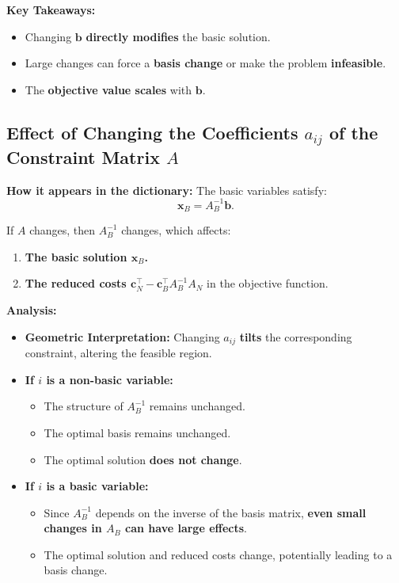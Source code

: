 \textbf{Key Takeaways:}
\begin{itemize}
    \item Changing \( \mathbf{b} \) \textbf{directly modifies} the basic solution.
    \item Large changes can force a \textbf{basis change} or make the problem \textbf{infeasible}.
    \item The \textbf{objective value scales} with \( \mathbf{b} \).
\end{itemize}

\subsection{Effect of Changing the Coefficients \( a_{ij} \) of the Constraint Matrix \( A \)}

\textbf{How it appears in the dictionary:}  
The basic variables satisfy:
\[
\mathbf{x}_B = A_B^{-1} \mathbf{b}.
\]

If \( A \) changes, then \( A_B^{-1} \) changes, which affects:
\begin{enumerate}
    \item \textbf{The basic solution \( \mathbf{x}_B \).}
    \item \textbf{The reduced costs \( \mathbf{c}_N^\top - \mathbf{c}_B^\top A_B^{-1} A_N \)} in the objective function.
\end{enumerate}

\textbf{Analysis:}
\begin{itemize}
    \item \textbf{Geometric Interpretation:} Changing \( a_{ij} \) \textbf{tilts} the corresponding constraint, altering the feasible region.
    \item \textbf{If \( i \) is a non-basic variable:}
    \begin{itemize}
        \item The structure of \( A_B^{-1} \) remains unchanged.
        \item The optimal basis remains unchanged.
        \item The optimal solution \textbf{does not change}.
    \end{itemize}
    \item \textbf{If \( i \) is a basic variable:}
    \begin{itemize}
        \item Since \( A_B^{-1} \) depends on the inverse of the basis matrix, \textbf{even small changes in \( A_B \) can have large effects}.
        \item The optimal solution and reduced costs change, potentially leading to a basis change.
    \end{itemize}
\end{itemize}

